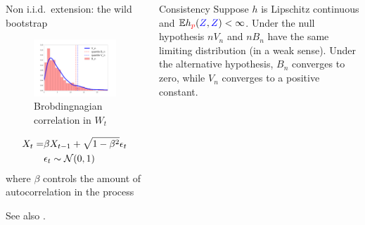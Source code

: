 \begin{frame}
\begin{columns}
\begin{column}{.33\linewidth}
\begin{block}{Non i.i.d.\ extension: the wild bootstrap}
 \begin{center}
  \begin{minipage}{.49\linewidth}
\begin{figure}
 \includegraphics[width=\textwidth]{../../presentation/img/bootstrapWorks7.pdf}
 \caption{Brobdingnagian correlation in $W_t$} 
\end{figure}
  \end{minipage}
\begin{minipage}{.49\linewidth}
\begin{align*}
 X_t =& \beta X_{t-1} + \sqrt{1 - \beta^2}\epsilon_t\\
 & \epsilon_t \sim {\cal N}(0,1)
\end{align*}
 where $\beta$ controls the amount of autocorrelation in the process
\end{minipage}
\end{center}

 See also \cite{leucht_dependent_2013}.
\end{block}
\end{column}


\hspace{-1.45cm}


\begin{column}{.32\linewidth}
\begin{block}{Consistency}
\large
 Suppose  $h$ is Lipschitz continuous and
$\mathbb{E} h_{{ \color{red} p}}({ \color{blue} Z},{ \color{blue} Z})<\infty$. Under the null hypothesis $nV_n$ and $nB_n$ have the same limiting distribution (in a weak sense). Under the alternative hypothesis,
$B_{n}$ converges to zero, while $V_{n}$ converges to a positive
constant.


\end{block}
\end{column}
\end{columns}
\end{frame}
